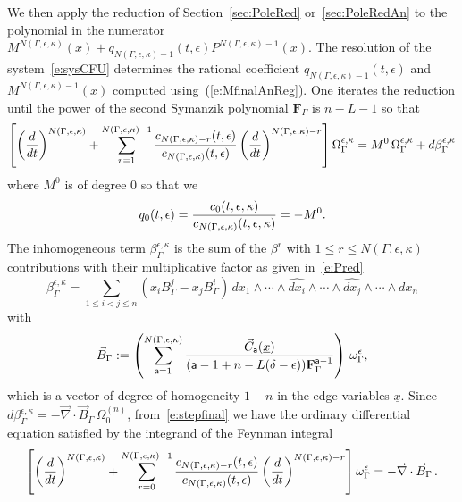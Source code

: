 \documentclass[a4paper,12pt]{article}
\numberwithin{equation}{section}
\numberwithin{figure}{section}
\begin{document}
We then apply the reduction of Section~\ref{sec:PoleRed} or~\ref{sec:PoleRedAn} to
the polynomial in the numerator
$M^{
      N(\Gamma,\epsilon,\kappa)}(\underline x)+q_{N(\Gamma,\epsilon,\kappa)-1}(t,\epsilon)
    P^{N(\Gamma,\epsilon,\kappa)-1}(\underline x)$.
The resolution of the
system~\eqref{e:sysCFU} determines the  rational coefficient
$q_{N(\Gamma,\epsilon,\kappa)-1}(t,\epsilon)$ and
$M^{N(\Gamma,\epsilon,\kappa)-1}(x)$ computed using~(\ref{e:MfinalAnReg}). One
iterates the reduction until the power of  the second Symanzik
polynomial $\textbf{F}_\Gamma$ is $n-L-1$ so
that
\begin{equation}\label{e:stepfinal}
\left[\left(d\over dt\right)^{N(\Gamma,\epsilon,\kappa)}
  +\sum_{r=1}^{N(\Gamma,\epsilon,\kappa)-1}
  {c_{N(\Gamma,\epsilon,\kappa)-r}(t,\epsilon)\over c_{N(\Gamma,\epsilon,\kappa)}(t,\epsilon)} \left(d\over dt\right)^{N(\Gamma,\epsilon,\kappa)-r}\right] \Omega_\Gamma^{\epsilon,\kappa}=M^{0}\,\Omega_\Gamma^{\epsilon,\kappa}+ d\beta_\Gamma^{\epsilon ,\kappa}
\end{equation}
where $M^0$ is of degree 0 so that we
\begin{equation}
  q_0(t,\epsilon)=  {c_{0}(t,\epsilon,\kappa)\over
    c_{N(\Gamma,\epsilon,\kappa)}(t,\epsilon,\kappa)}= -M^0  .
\end{equation}
The inhomogeneous term  $\beta_\Gamma^{\epsilon,\kappa} $ is the sum of the
$\beta^r$ with $1\leq
r\leq N(\Gamma,\epsilon,\kappa)$
contributions with their multiplicative factor as given
in~\eqref{e:Pred}
\begin{equation}
  \label{e:betaGamma}
  \beta_\Gamma^{\epsilon,\kappa}= \sum_{1\leq i<j\leq n} (x_i B^j_\Gamma- x_j B^i_\Gamma) \,
  dx_1\wedge \cdots \wedge \widehat{dx_i}\wedge \cdots \wedge\widehat{dx_j}\wedge
  \cdots \wedge dx_n 
\end{equation}
with
\begin{equation}
  \label{e:BetaGamma}
  \vec B_\Gamma:=\left(\sum_{\mathsf{a}=1}^{N(\Gamma,\epsilon,\kappa)} {
      \vec C_{\mathsf{a}} (\underline x) \over
   ( \mathsf{a}-1+n-L(\delta-\epsilon))\mathbf{F}_\Gamma^{\mathsf{a}-1}}\right) \,\omega_\Gamma^\epsilon ,
\end{equation}
which is a vector of degree of homogeneity $1-n$ in the edge variables
$\underline x$.
Since $d\beta_\Gamma^{\epsilon,\kappa}= -\vec\nabla\cdot \vec B_\Gamma\,
\Omega_0^{(n)}$, from~\eqref{e:stepfinal} we have the ordinary
differential equation satisfied by the integrand of the Feynman
integral
\begin{equation}\label{e:stepfinalode}
\left[\left(d\over dt\right)^{N(\Gamma,\epsilon,\kappa)}
  +\sum_{r=0}^{N(\Gamma,\epsilon,\kappa)-1}
  {c_{N(\Gamma,\epsilon,\kappa)-r}(t,\epsilon)\over c_{N(\Gamma,\epsilon,\kappa)}(t,\epsilon)} \left(d\over dt\right)^{N(\Gamma,\epsilon,\kappa)-r}\right] \omega_\Gamma^\epsilon =-\vec\nabla\cdot \vec B_\Gamma\,.
\end{equation}
\end{document}
